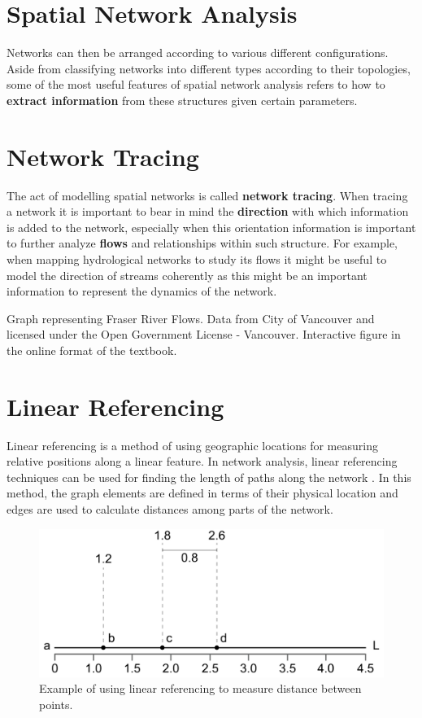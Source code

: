 \documentclass[
]{book}
\begin{document}
\hypertarget{spatial-network-analysis}{%
\section{Spatial Network Analysis}\label{spatial-network-analysis}}

Networks can then be arranged according to various different configurations. Aside from classifying networks into different types according to their topologies, some of the most useful features of spatial network analysis refers to how to \textbf{extract information} from these structures given certain parameters.

\hypertarget{network-tracing}{%
\section{Network Tracing}\label{network-tracing}}

The act of modelling spatial networks is called \textbf{network tracing}. When tracing a network it is important to bear in mind the \textbf{direction} with which information is added to the network, especially when this orientation information is important to further analyze \textbf{flows} and relationships within such structure. For example, when mapping hydrological networks to study its flows it might be useful to model the direction of streams coherently as this might be an important information to represent the dynamics of the network.

\label{fig:unnamed-chunk-20}Graph representing Fraser River Flows. Data from City of Vancouver and licensed under the Open Government License - Vancouver. Interactive figure in the online format of the textbook.

\hypertarget{linear-referencing}{%
\section{Linear Referencing}\label{linear-referencing}}

Linear referencing is a method of using geographic locations for measuring relative positions along a linear feature. In network analysis, linear referencing techniques can be used for finding the length of paths along the network \citep{ramsey23LinearReferencing2012}. In this method, the graph elements are defined in terms of their physical location and edges are used to calculate distances among parts of the network.

\begin{figure}
\includegraphics[width=0.8\linewidth]{images/08-linear_referencing} \caption{Example of using linear referencing to measure distance between points.}\label{fig:unnamed-chunk-21}
\end{figure}
\end{document}
